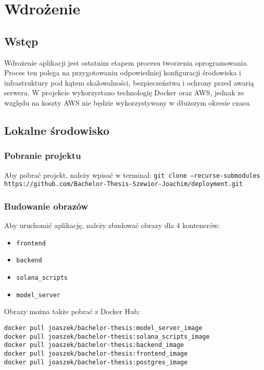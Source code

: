 \chapter{Wdrożenie}
\section{Wstęp}
Wdrożenie aplikacji jest ostatnim etapem procesu tworzenia oprogramowania. Proces ten polega na przygotowaniu odpowiedniej konfiguracji środowiska i infrastruktury pod kątem skalowalności, bezpieczeństwa i ochrony przed awarią serwera. W projekcie wykorzystano technologię Docker oraz AWS, jednak ze względu na koszty AWS nie będzie wykorzystywany w dłuższym okresie czasu.

\section{Lokalne środowisko}
\subsection{Pobranie projektu}
Aby pobrać projekt, należy wpisać w terminal:
\texttt{git clone --recurse-submodules https://github.com/Bachelor-Thesis-Szewior-Joachim/deployment.git}

\subsection{Budowanie obrazów}
Aby uruchomić aplikację, należy zbudować obrazy dla 4 kontenerów:
\begin{itemize}
    \item \texttt{frontend}
    \item \texttt{backend}
    \item \texttt{solana\_scripts}
    \item \texttt{model\_server}
\end{itemize}

Obrazy można także pobrać z Docker Hub:
\begin{lstlisting}[basicstyle=\footnotesize\ttfamily]
docker pull joaszek/bachelor-thesis:model_server_image
docker pull joaszek/bachelor-thesis:solana_scripts_image
docker pull joaszek/bachelor-thesis:backend_image
docker pull joaszek/bachelor-thesis:frontend_image
docker pull joaszek/bachelor-thesis:postgres_image
\end{lstlisting}

